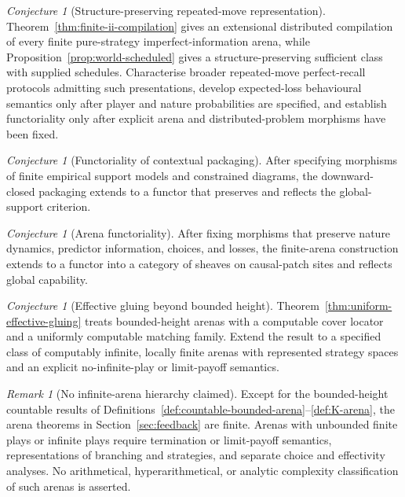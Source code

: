 \documentclass[11pt]{article}
\theoremstyle{plain}
\theoremstyle{definition}
\theoremstyle{remark}
\newtheorem{remark}[theorem]{Remark}
\newtheorem{conjecture}[theorem]{Conjecture}
\begin{document}
\begin{conjecture}[Structure-preserving repeated-move representation]
\label{conj:imperfect}
Theorem~\ref{thm:finite-ii-compilation} gives an extensional distributed
compilation of every finite pure-strategy imperfect-information arena, while
Proposition~\ref{prop:world-scheduled} gives a structure-preserving sufficient
class with supplied schedules. Characterise broader repeated-move perfect-recall
protocols admitting such presentations, develop expected-loss behavioural
semantics only after player and nature probabilities are specified, and
establish functoriality only after explicit arena and distributed-problem
morphisms have been fixed.
\end{conjecture}

\begin{conjecture}[Functoriality of contextual packaging]\label{conj:context}
After specifying morphisms of finite empirical support models and constrained
diagrams, the downward-closed packaging extends to a functor that preserves and
reflects the global-support criterion.
\end{conjecture}

\begin{conjecture}[Arena functoriality]\label{conj:arena-functor}
After fixing morphisms that preserve nature dynamics, predictor information,
choices, and losses, the finite-arena construction extends to a functor into a
category of sheaves on causal-patch sites and reflects global capability.
\end{conjecture}

\begin{conjecture}[Effective gluing beyond bounded height]
\label{conj:effective-gluing}
Theorem~\ref{thm:uniform-effective-gluing} treats bounded-height arenas with a
computable cover locator and a uniformly computable matching family. Extend the
result to a specified class of computably infinite, locally finite arenas with
represented strategy spaces and an explicit no-infinite-play or limit-payoff
semantics.
\end{conjecture}

\begin{remark}[No infinite-arena hierarchy claimed]
Except for the bounded-height countable results of
Definitions~\ref{def:countable-bounded-arena}--\ref{def:K-arena}, the arena
theorems in Section~\ref{sec:feedback} are finite. Arenas with unbounded finite
plays or infinite plays require termination or limit-payoff semantics,
representations of branching and strategies, and separate choice and
effectivity analyses. No arithmetical, hyperarithmetical, or analytic complexity
classification of such arenas is asserted.
\end{remark}
\end{document}
